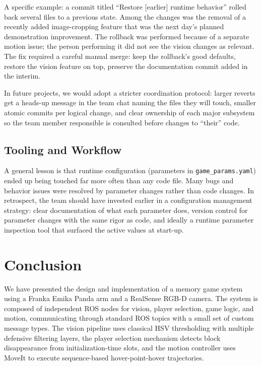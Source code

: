 \documentclass[conference]{IEEEtran}
\begin{document}
A specific example: a commit titled ``Restore [earlier] runtime
behavior'' rolled back several files to a previous state. Among the
changes was the removal of a recently added image-cropping feature
that was the next day's planned demonstration improvement. The
rollback was performed because of a separate motion issue; the
person performing it did not see the vision changes as relevant. The
fix required a careful manual merge: keep the rollback's good
defaults, restore the vision feature on top, preserve the
documentation commit added in the interim.

In future projects, we would adopt a stricter coordination protocol:
larger reverts get a heads-up message in the team chat naming the
files they will touch, smaller atomic commits per logical change, and
clear ownership of each major subsystem so the team member responsible
is consulted before changes to ``their'' code.

\subsection{Tooling and Workflow}

A general lesson is that runtime configuration (parameters in
\texttt{game\_params.yaml}) ended up being touched far more often
than any code file. Many bugs and behavior issues were resolved by
parameter changes rather than code changes. In retrospect, the team
should have invested earlier in a configuration management strategy:
clear documentation of what each parameter does, version control for
parameter changes with the same rigor as code, and ideally a runtime
parameter inspection tool that surfaced the active values at start-up.

\section{Conclusion}
\label{sec:conclusion}

We have presented the design and implementation of a memory game
system using a Franka Emika Panda arm and a RealSense RGB-D camera.
The system is composed of independent ROS nodes for vision, player
selection, game logic, and motion, communicating through standard ROS
topics with a small set of custom message types. The vision pipeline
uses classical HSV thresholding with multiple defensive filtering
layers, the player selection mechanism detects block disappearance
from initialization-time slots, and the motion controller uses MoveIt
to execute sequence-based hover-point-hover trajectories.
\end{document}
